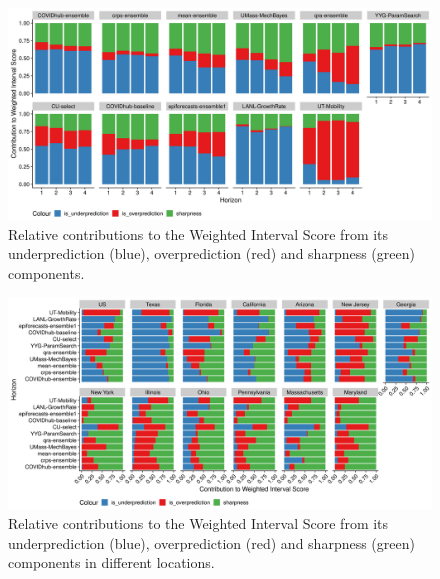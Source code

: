 \documentclass[
]{book}
\begin{document}
\begin{figure}

{\centering \includegraphics[width=1\linewidth]{../visualisation/chapter-5-results/scenario-baseline/wis-contributions-relative} 

}

\caption{Relative contributions to the Weighted Interval Score from its underprediction (blue), overprediction (red) and sharpness (green) components.}\label{fig:wis-contributions-relative}
\end{figure}

\begin{figure}

{\centering \includegraphics[width=1\linewidth]{../visualisation/chapter-5-results/scenario-baseline/wis-contributions-rel-state2} 

}

\caption{Relative contributions to the Weighted Interval Score from its underprediction (blue), overprediction (red) and sharpness (green) components in different locations.}\label{fig:wis-contributions-rel-state}
\end{figure}
\end{document}
